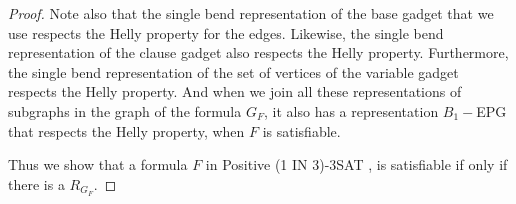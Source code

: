 \documentclass[a4paper,11pt]{article}
\begin{document}
\begin{proof}
Note also that the single bend representation of the base gadget that we use respects the Helly property for the edges. Likewise, the single bend  representation of the clause gadget also respects the Helly property. Furthermore, the single bend representation of the set of vertices of the variable gadget respects the Helly property. And when we join all these representations of subgraphs in the graph of the formula $ G_F $, it also has a representation $ B_1-$EPG that respects the Helly property, when $ F $ is satisfiable.




Thus we show that a formula $F$ in {\sc Positive (1 IN 3)-3SAT }, is satisfiable if only if there is a $R_{G_F}$.
\end{proof}





\end{document}
